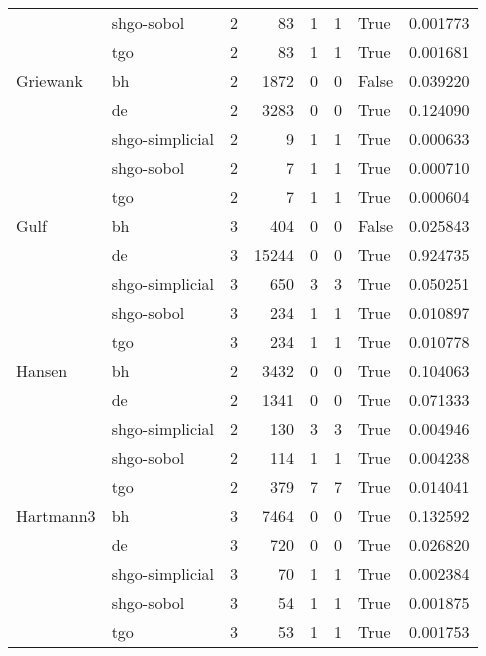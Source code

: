 \begin{longtable}{llrrrrlr}
         & shgo-sobol &     2 &       83 &      1 &       1 &    True &    0.001773 \\
         & tgo &     2 &       83 &      1 &       1 &    True &    0.001681 \\
Griewank & bh &     2 &     1872 &      0 &       0 &   False &    0.039220 \\
         & de &     2 &     3283 &      0 &       0 &    True &    0.124090 \\
         & shgo-simplicial &     2 &        9 &      1 &       1 &    True &    0.000633 \\
         & shgo-sobol &     2 &        7 &      1 &       1 &    True &    0.000710 \\
         & tgo &     2 &        7 &      1 &       1 &    True &    0.000604 \\
Gulf & bh &     3 &      404 &      0 &       0 &   False &    0.025843 \\
         & de &     3 &    15244 &      0 &       0 &    True &    0.924735 \\
         & shgo-simplicial &     3 &      650 &      3 &       3 &    True &    0.050251 \\
         & shgo-sobol &     3 &      234 &      1 &       1 &    True &    0.010897 \\
         & tgo &     3 &      234 &      1 &       1 &    True &    0.010778 \\
Hansen & bh &     2 &     3432 &      0 &       0 &    True &    0.104063 \\
         & de &     2 &     1341 &      0 &       0 &    True &    0.071333 \\
         & shgo-simplicial &     2 &      130 &      3 &       3 &    True &    0.004946 \\
         & shgo-sobol &     2 &      114 &      1 &       1 &    True &    0.004238 \\
         & tgo &     2 &      379 &      7 &       7 &    True &    0.014041 \\
Hartmann3 & bh &     3 &     7464 &      0 &       0 &    True &    0.132592 \\
         & de &     3 &      720 &      0 &       0 &    True &    0.026820 \\
         & shgo-simplicial &     3 &       70 &      1 &       1 &    True &    0.002384 \\
         & shgo-sobol &     3 &       54 &      1 &       1 &    True &    0.001875 \\
         & tgo &     3 &       53 &      1 &       1 &    True &    0.001753 \\

\end{longtable}
